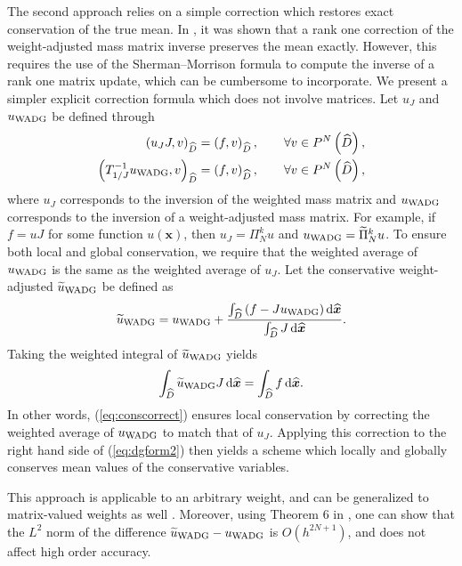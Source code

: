 \documentclass[preprint,10pt]{article}
\theoremstyle{definition}
\theoremstyle{lemma}
\theoremstyle{theorem}
\theoremstyle{assumption}
\renewcommand{\hat}{\widehat}
\renewcommand{\tilde}{\widetilde}
\newcommand{\LRp}[1]{\left( #1 \right)}
\newcommand*\diff[1]{\mathop{}\!{\mathrm{d}#1}} %
\begin{document}
{The second approach relies on a simple correction which restores exact conservation of the true mean.  In \cite{chan2016weight2}, it was shown that a rank one correction of the weight-adjusted mass matrix inverse preserves the mean exactly.  However, this requires the use of the Sherman--Morrison formula to compute the inverse of a rank one matrix update, which can be cumbersome to incorporate.  We present a simpler explicit correction formula which does not involve matrices.  Let $u_J$ and $u_{\rm WADG}$ be defined through 
\begin{align*}
\LRp{u_J J,v}_{\hat{D}} &= \LRp{f,v}_{\hat{D}}, \qquad \forall v \in P^N\LRp{\hat{D}},\\
\LRp{T_{1/J}^{-1}u_{\rm WADG},v}_{\hat{D}} &= \LRp{f,v}_{\hat{D}}, \qquad \forall v \in P^N\LRp{\hat{D}},
\end{align*}
where $u_J$ corresponds to the inversion of the weighted mass matrix and $u_{\rm WADG}$ corresponds to the inversion of a weight-adjusted mass matrix.  For example, if $f = u J$ for some function $u(\bm{x})$, then $u_J = \Pi^k_N u$ and $u_{\rm WADG} = \tilde{\Pi}^k_N u$.  To ensure both local and global conservation, we require that the weighted average of $u_{\rm WADG}$ is the same as the weighted average of $u_J$.  Let the conservative weight-adjusted $\tilde{u}_{\rm WADG}$ be defined as
\begin{equation}
  \tilde{u}_{\rm WADG} = u_{\rm WADG} + \frac{\int_{\hat{D}} \left(f  - J u_{\rm WADG}\right)\diff{\hat{\bm{x}}}}{\int_{\hat{D}} J \diff{\hat{\bm{x}}}}.  
  \label{eq:conscorrect}
\end{equation}
Taking the weighted integral of $\tilde{u}_{\rm WADG}$ yields
\[
  \int_{\hat{D}}\tilde{u}_{\rm WADG}J \diff{\hat{\bm{x}}} = \int_{\hat{D}} f \diff{\hat{\bm{x}}}.
\]
In other words, (\ref{eq:conscorrect}) ensures local conservation by correcting the weighted average of $u_{\rm WADG}$ to match that of $u_J$.  Applying this correction to the right hand side of (\ref{eq:dgform2}) then yields a scheme which locally and globally conserves mean values of the conservative variables.

This approach is applicable to an arbitrary weight, and can be generalized to matrix-valued weights as well \cite{chan2017weight}.  Moreover, using Theorem 6 in \cite{chan2016weight1}, one can show that the $L^2$ norm of the difference $\tilde{u}_{\rm WADG} - u_{\rm WADG}$ is $O(h^{2N+1})$, and does not affect high order accuracy.  

}
\end{document}
